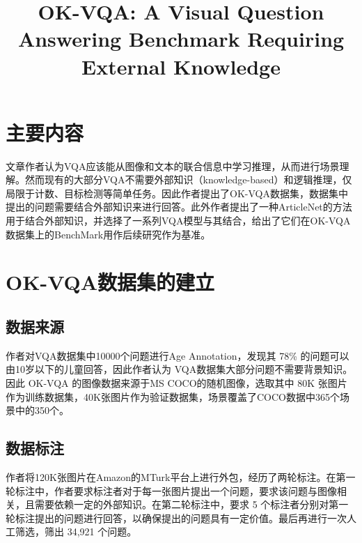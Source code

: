 \documentclass[conference,10pt]{IEEEtran}
\begin{document}
\title{OK-VQA: A Visual Question Answering Benchmark Requiring External Knowledge}

\author{
	}
\maketitle

\section{主要内容}
文章作者认为VQA应该能从图像和文本的联合信息中学习推理，从而进行场景理解。然而现有的大部分VQA不需要外部知识（knowledge-based）和逻辑推理，仅局限于计数、目标检测等简单任务。因此作者提出了OK-VQA数据集，数据集中提出的问题需要结合外部知识来进行回答。此外作者提出了一种ArticleNet的方法用于结合外部知识，并选择了一系列VQA模型与其结合，给出了它们在OK-VQA数据集上的BenchMark用作后续研究作为基准。
\section{OK-VQA数据集的建立}
\subsection{数据来源}
作者对VQA数据集中10000个问题进行Age Annotation，发现其 78\% 的问题可以由10岁以下的儿童回答，因此作者认为 VQA数据集大部分问题不需要背景知识。因此 OK-VQA 的图像数据来源于MS COCO的随机图像，选取其中 80K 张图片作为训练数据集，40K张图片作为验证数据集，场景覆盖了COCO数据中365个场景中的350个。
\subsection{数据标注}
作者将120K张图片在Amazon的MTurk平台上进行外包，经历了两轮标注。在第一轮标注中，作者要求标注者对于每一张图片提出一个问题，要求该问题与图像相关，且需要依赖一定的外部知识。在第二轮标注中，要求 5 个标注者分别对第一轮标注提出的问题进行回答，以确保提出的问题具有一定价值。最后再进行一次人工筛选，筛出 34,921 个问题。
\end{document}
